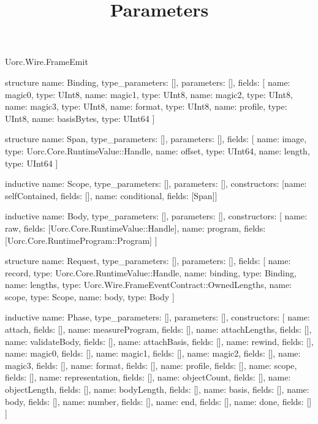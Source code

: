 \begin{lexlean}{Uorc.Wire.FrameEmit}
\title{Parameters}
\begin{semanticmodule}
structure{
  name: Binding,
  type_parameters: [],
  parameters: [],
  fields: [
    {name: magic0, type: UInt8},
    {name: magic1, type: UInt8},
    {name: magic2, type: UInt8},
    {name: magic3, type: UInt8},
    {name: format, type: UInt8},
    {name: profile, type: UInt8},
    {name: basisBytes, type: UInt64}
  ]
}

structure{
  name: Span,
  type_parameters: [],
  parameters: [],
  fields: [
    {name: image, type: Uorc.Core.RuntimeValue::Handle},
    {name: offset, type: UInt64},
    {name: length, type: UInt64}
  ]
}

inductive{
  name: Scope,
  type_parameters: [],
  parameters: [],
  constructors: [{name: selfContained, fields: []}, {name: conditional, fields: [Span]}]
}

inductive{
  name: Body,
  type_parameters: [],
  parameters: [],
  constructors: [
    {name: raw, fields: [Uorc.Core.RuntimeValue::Handle]},
    {name: program, fields: [Uorc.Core.RuntimeProgram::Program]}
  ]
}

structure{
  name: Request,
  type_parameters: [],
  parameters: [],
  fields: [
    {name: record, type: Uorc.Core.RuntimeValue::Handle},
    {name: binding, type: Binding},
    {name: lengths, type: Uorc.Wire.FrameEventContract::OwnedLengths},
    {name: scope, type: Scope},
    {name: body, type: Body}
  ]
}

inductive{
  name: Phase,
  type_parameters: [],
  parameters: [],
  constructors: [
    {name: attach, fields: []},
    {name: measureProgram, fields: []},
    {name: attachLengths, fields: []},
    {name: validateBody, fields: []},
    {name: attachBasis, fields: []},
    {name: rewind, fields: []},
    {name: magic0, fields: []},
    {name: magic1, fields: []},
    {name: magic2, fields: []},
    {name: magic3, fields: []},
    {name: format, fields: []},
    {name: profile, fields: []},
    {name: scope, fields: []},
    {name: representation, fields: []},
    {name: objectCount, fields: []},
    {name: objectLength, fields: []},
    {name: bodyLength, fields: []},
    {name: basis, fields: []},
    {name: body, fields: []},
    {name: number, fields: []},
    {name: end, fields: []},
    {name: done, fields: []}
  ]
}


\end{semanticmodule}
\end{lexlean}
